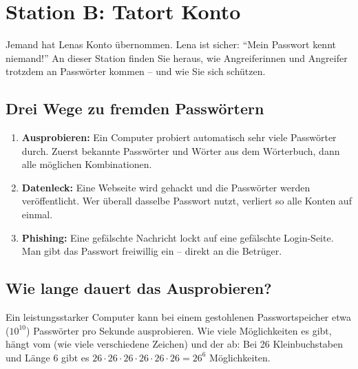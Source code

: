 \chapter{Station B: Tatort Konto}\label{ch:tatort_konto}

\begin{myremark}
	Jemand hat Lenas Konto übernommen. Lena ist sicher: \enquote{Mein Passwort kennt niemand!}
	An dieser Station finden Sie heraus, wie Angreiferinnen und Angreifer trotzdem an Passwörter kommen -- und wie Sie sich schützen.
\end{myremark}

\section{Drei Wege zu fremden Passwörtern}

\begin{mysummary}
	\begin{enumerate}
		\item \textbf{Ausprobieren:} Ein Computer probiert automatisch sehr viele Passwörter durch. Zuerst bekannte Passwörter und Wörter aus dem Wörterbuch, dann alle möglichen Kombinationen.
		\item \textbf{Datenleck:} Eine Webseite wird gehackt und die Passwörter werden veröffentlicht. Wer überall dasselbe Passwort nutzt, verliert so alle Konten auf einmal.
		\item \textbf{Phishing:} Eine gefälschte Nachricht lockt auf eine gefälschte Login-Seite. Man gibt das Passwort freiwillig ein -- direkt an die Betrüger.
	\end{enumerate}
\end{mysummary}

\section{Wie lange dauert das Ausprobieren?}

Ein leistungsstarker Computer kann bei einem gestohlenen Passwortspeicher etwa  ($10^{10}$) Passwörter pro Sekunde ausprobieren.
Wie viele Möglichkeiten es gibt, hängt vom  (wie viele verschiedene Zeichen) und der  ab:
Bei 26 Kleinbuchstaben und Länge 6 gibt es $26 \cdot 26 \cdot 26 \cdot 26 \cdot 26 \cdot 26 = 26^6$ Möglichkeiten.

